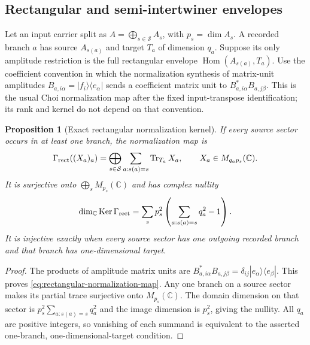 \documentclass[11pt]{article}
\numberwithin{equation}{section}
\newtheorem{proposition}[theorem]{Proposition}
\theoremstyle{definition}
\theoremstyle{remark}
\newcommand{\C}{\mathbb C}
\newcommand{\Tr}{\operatorname{Tr}}
\newcommand{\Ker}{\operatorname{Ker}}
\newcommand{\Hom}{\operatorname{Hom}}
\begin{document}
\subsection{Rectangular and semi-intertwiner envelopes}

Let an input carrier split as $A=\bigoplus_{s\in\mathcal S}A_s$,
with $p_s=\dim A_s$.  A recorded branch $a$ has source $A_{s(a)}$
and target $T_a$ of dimension $q_a$.  Suppose its only amplitude restriction
is the full rectangular envelope $\Hom(A_{s(a)},T_a)$.
Use the coefficient convention in which the normalization synthesis of
matrix-unit amplitudes $B_{a,i\alpha}=|f_i\rangle\langle e_\alpha|$
sends a coefficient matrix unit to $B_{a,i\alpha}^*B_{a,j\beta}$.
This is the usual Choi normalization map after the fixed input-transpose
identification; its rank and kernel do not depend on that convention.

\begin{proposition}[Exact rectangular normalization kernel]
\label{thm:rectangular-normalization-kernel}
If every source sector occurs in at least one branch, the normalization map is
\begin{equation}
 \Gamma_{\rm rect}((X_a)_a)
 =\bigoplus_{s\in\mathcal S}
       \sum_{a:s(a)=s}\Tr_{T_a}X_a,
 \qquad X_a\in M_{q_ap_s}(\C).
 \label{eq:rectangular-normalization-map}
\end{equation}
It is surjective onto $\bigoplus_s M_{p_s}(\C)$ and has complex nullity
\begin{equation}
 \dim_\C\Ker\Gamma_{\rm rect}
 =\sum_s p_s^2\left(\sum_{a:s(a)=s}q_a^2-1\right).
 \label{eq:rectangular-normalization-nullity}
\end{equation}
It is injective exactly when every source sector has one outgoing recorded
branch and that branch has one-dimensional target.
\end{proposition}

\begin{proof}
The products of amplitude matrix units are
$B_{a,i\alpha}^*B_{a,j\beta}=\delta_{ij}|e_\alpha\rangle\langle e_\beta|$.
This proves \eqref{eq:rectangular-normalization-map}.  Any one branch on a
source sector makes its partial trace surjective onto $M_{p_s}(\C)$.
The domain dimension on that sector is $p_s^2\sum_{a:s(a)=s}q_a^2$ and
the image dimension is $p_s^2$, giving the nullity.  All $q_a$ are positive
integers, so vanishing of each summand is equivalent to the asserted
one-branch, one-dimensional-target condition.
\end{proof}
\end{document}
